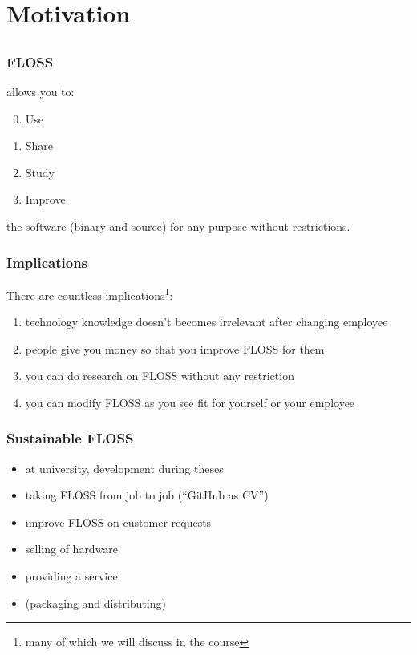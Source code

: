 \section{Motivation}
\subsection{}
\begin{frame}
	\frametitle{FLOSS}
	\floss{} allows you to:
	\vspace{1em}
	\begin{enumerate}[<+-| alert@+>]
		\setcounter{enumi}{-1}
		\item Use
		\item Share
		\item Study
		\item Improve
	\end{enumerate}
	\vspace{1em}
	the software (binary and source) for any purpose without restrictions.
\end{frame}

\begin{frame}
	\frametitle{Implications}

	There are countless implications\footnote{many of which we will discuss in the course}:
	\begin{enumerate}[<+-| alert@+>]
		\item technology knowledge doesn't becomes irrelevant after changing employee
		\item people give you money so that you improve FLOSS for them
		\item you can do research on FLOSS without any restriction
		\item you can modify FLOSS as you see fit for yourself or your employee
	\end{enumerate}
\end{frame}

\begin{frame}[fragile]
	\frametitle{Sustainable FLOSS}

	\begin{itemize}[<+-| alert@+>]
		\item at university, development during theses
		\item taking FLOSS from job to job (``GitHub as CV'')
		\item improve FLOSS on customer requests
		\item selling of hardware
		\item providing a service
		\item (packaging and distributing)
	\end{itemize}
\end{frame}

